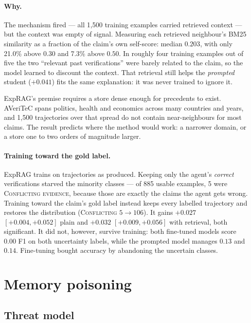 \documentclass[11pt]{article}
\begin{document}
\paragraph{Why.} The mechanism fired --- all 1{,}500 training examples carried
retrieved context --- but the context was empty of signal. Measuring each
retrieved neighbour's BM25 similarity as a fraction of the claim's own
self-score: median $0.203$, with only 21.0\% above $0.30$ and 7.3\% above
$0.50$. In roughly four training examples out of five the two ``relevant past
verifications'' were barely related to the claim, so the model learned to
discount the context. That retrieval still helps the \emph{prompted} student
($+0.041$) fits the same explanation: it was never trained to ignore it.

ExpRAG's premise requires a store dense enough for precedents to exist. AVeriTeC
spans politics, health and economics across many countries and years, and 1{,}500
trajectories over that spread do not contain near-neighbours for most claims.
The result predicts where the method would work: a narrower domain, or a store
one to two orders of magnitude larger.

\paragraph{Training toward the gold label.} ExpRAG trains on trajectories as
produced. Keeping only the agent's \emph{correct} verifications starved the
minority classes --- of 885 usable examples, 5 were \textsc{Conflicting
evidence}, because those are exactly the claims the agent gets wrong. Training
toward the claim's gold label instead keeps every labelled trajectory and
restores the distribution (\textsc{Conflicting} $5 \rightarrow 106$). It gains
$+0.027$ $[+0.004, +0.052]$ plain and $+0.032$ $[+0.009, +0.056]$ with
retrieval, both significant. It did not, however, survive training: both
fine-tuned models score $0.00$ F1 on both uncertainty labels, while the prompted
model manages $0.13$ and $0.14$. Fine-tuning bought accuracy by abandoning the
uncertain classes.

\section{Memory poisoning}
\label{sec:c1}

\subsection{Threat model}
\end{document}
